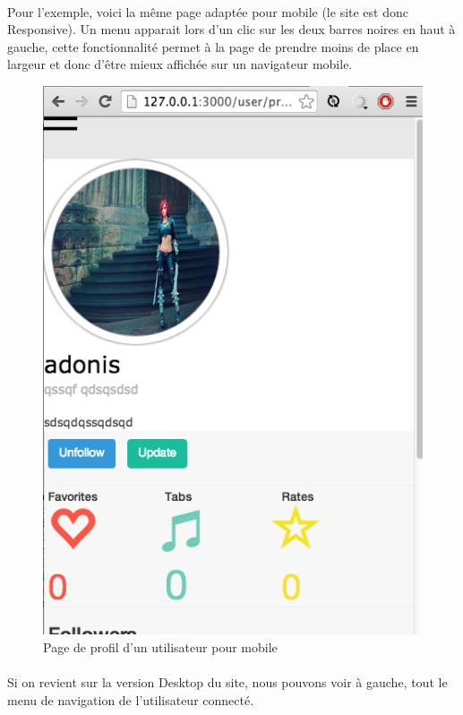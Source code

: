\paragraph{}
Pour l'exemple, voici la même page adaptée pour mobile (le site est donc Responsive). Un menu apparait lors d'un clic sur les deux barres noires en haut à gauche, cette fonctionnalité permet à la page de prendre moins de place en largeur et donc d'être mieux affichée sur un navigateur mobile.
\begin{figure}[H]
\centering
\includegraphics[scale=0.5]{Responsive1}
\caption{Page de profil d'un utilisateur pour mobile}
\end{figure}
\paragraph{}

\paragraph{}
Si on revient sur la version Desktop du site, nous pouvons voir à gauche, tout le menu de navigation de l'utilisateur connecté.

